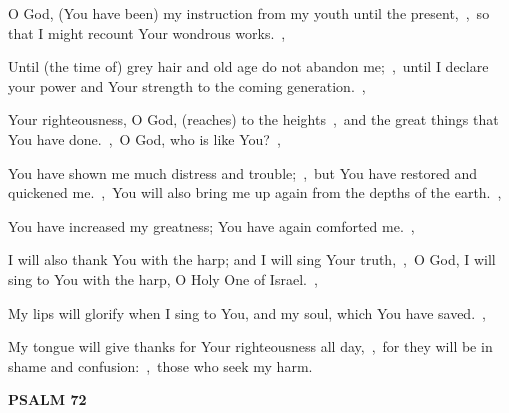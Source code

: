 \documentclass[12pt,twoside,a5paper]{article}
\newcommand{\psalm}[1]{\textbf{PSALM {#1}}\nopagebreak}
\begin{document}
\begin{normalparskip}
  O God, (You have been) my instruction from my youth until the present,~\sep\ so that I might recount Your wondrous works.~\sep

  Until (the time of) grey hair and old age do not abandon me;~\sep\ until I declare your power and Your strength to the coming generation.~\sep

  Your righteousness, O God, (reaches) to the heights~\sep\ and the great things that You have done.~\sep\ O God, who is like You?~\sep

  You have shown me much distress and trouble;~\sep\ but You have restored and quickened me.~\sep\ You will also bring me up again from the depths of the earth.~\sep

  You have increased my greatness; You have again comforted me.~\sep

  I will also thank You with the harp; and I will sing Your truth,~\sep\ O God, I will sing to You with the harp, O Holy One of Israel.~\sep

  My lips will glorify when I sing to You, and my soul, which You have saved.~\sep

  My tongue will give thanks for Your righteousness all day,~\sep\ for they will be in shame and confusion:~\sep\ those who seek my harm.
\end{normalparskip}

\psalm{72}
\end{document}
